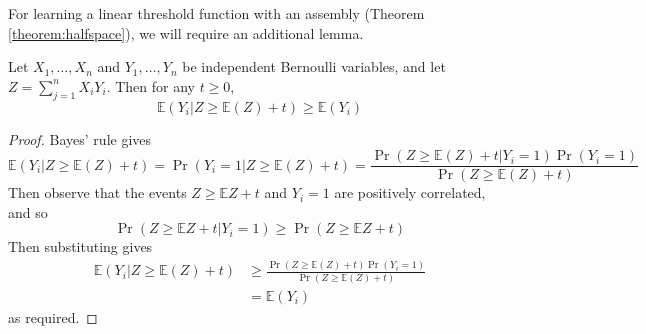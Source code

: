\documentclass[final,12pt]{colt2022} %
\newcommand{\E}{\mathbb{E}}
\begin{document}
\noindent For learning a linear threshold function with an assembly (Theorem \ref{theorem:halfspace}), we will require an additional lemma. 
\begin{lemma}\label{lemma:dotprod}
Let $X_1, \ldots, X_n$ and $Y_1, \ldots, Y_n$ be independent Bernoulli variables, and let $Z = \sum_{j=1}^n X_i Y_i$. Then for any $t \ge 0$, \[ \E(Y_i \vert Z \ge \E(Z) + t) \ge \E(Y_i) \]
\end{lemma}
\begin{proof}
Bayes' rule gives \[\E(Y_i \vert Z \ge \E(Z) + t) = \Pr(Y_i=1 \vert Z \ge \E(Z) + t) = \frac{\Pr(Z \ge \E(Z) + t \vert Y_i = 1) \Pr(Y_i = 1)}{\Pr(Z \ge \E(Z) + t)}\] Then observe that the events $Z \ge \E Z + t$ and $Y_i = 1$ are positively correlated, and so 
\[\Pr(Z \ge \E Z + t \vert Y_i = 1) \ge \Pr(Z \ge \E Z + t)\]
Then substituting gives
\begin{align*}
    \E(Y_i \vert Z \ge \E(Z) + t) &\ge \frac{\Pr\left(Z \ge \E(Z) + t\right) \Pr(Y_i = 1)}{\Pr(Z \ge \E(Z) + t)}\\
    &= \E(Y_i)
\end{align*} as required.
\end{proof}



\end{document}
